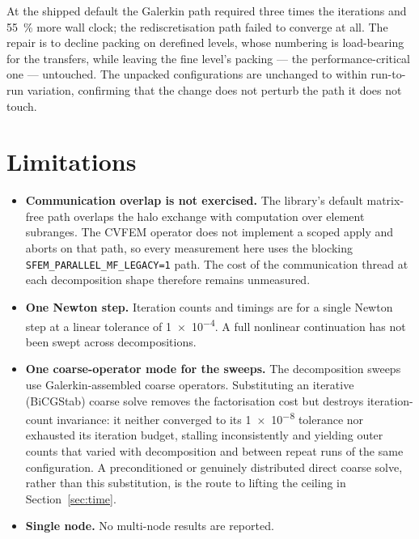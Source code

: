 \documentclass[11pt,a4paper]{article}
\begin{document}
At the shipped default the Galerkin path required three times the iterations and
\SI{55}{\percent} more wall clock; the rediscretisation path failed to converge
at all. The repair is to decline packing on derefined levels, whose numbering is
load-bearing for the transfers, while leaving the fine level's packing --- the
performance-critical one --- untouched. The unpacked configurations are unchanged
to within run-to-run variation, confirming that the change does not perturb the
path it does not touch.

\section{Limitations}

\begin{itemize}
  \item \textbf{Communication overlap is not exercised.} The library's default
    matrix-free path overlaps the halo exchange with computation over element
    subranges. The CVFEM operator does not implement a scoped apply and aborts on
    that path, so every measurement here uses the blocking
    \texttt{SFEM\_PARALLEL\_MF\_LEGACY=1} path. The cost of the communication
    thread at each decomposition shape therefore remains unmeasured.
  \item \textbf{One Newton step.} Iteration counts and timings are for a single
    Newton step at a linear tolerance of \num{1e-4}. A full nonlinear
    continuation has not been swept across decompositions.
  \item \textbf{One coarse-operator mode for the sweeps.} The decomposition
    sweeps use Galerkin-assembled coarse operators. Substituting an iterative
    (BiCGStab) coarse solve removes the factorisation cost but destroys
    iteration-count invariance: it neither converged to its \num{1e-8} tolerance
    nor exhausted its iteration budget, stalling inconsistently and yielding
    outer counts that varied with decomposition and between repeat runs of the
    same configuration. A preconditioned or genuinely distributed direct coarse
    solve, rather than this substitution, is the route to lifting the ceiling in
    Section~\ref{sec:time}.
  \item \textbf{Single node.} No multi-node results are reported.
\end{itemize}
\end{document}
